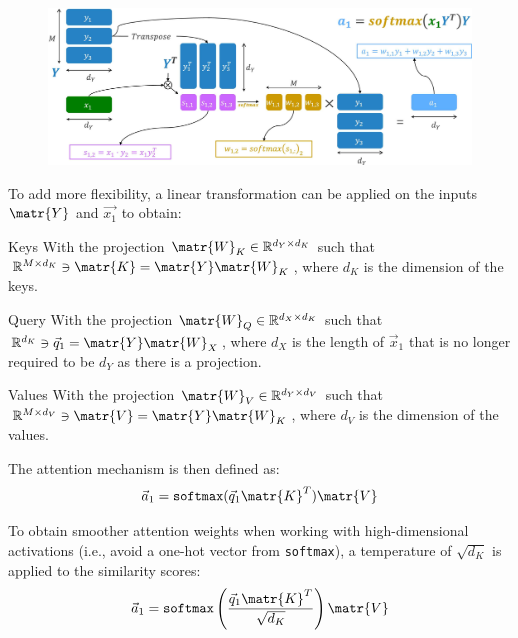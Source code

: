 \begin{description}
        \begin{figure}[H]
            \centering
            \includegraphics[width=0.8\linewidth]{./img/_dot_product_attention.jpg}
        \end{figure}

    \item[Scaled dot-product attention] 
        To add more flexibility, a linear transformation can be applied on the inputs $\matr{Y}$ and $\vec{x_1}$ to obtain:
        \begin{descriptionlist}
            \item[Keys] 
                With the projection $\matr{W}_K \in \mathbb{R}^{d_Y \times d_K}$ such that $\mathbb{R}^{M \times d_K} \ni \matr{K} = \matr{Y} \matr{W}_K$, where $d_K$ is the dimension of the keys.

            \item[Query] 
                With the projection $\matr{W}_Q \in \mathbb{R}^{d_X \times d_K}$ such that $\mathbb{R}^{d_K} \ni \vec{q}_1 = \matr{Y} \matr{W}_X$, where $d_X$ is the length of $\vec{x}_1$ that is no longer required to be $d_Y$ as there is a projection.

            \item[Values]
                With the projection $\matr{W}_V \in \mathbb{R}^{d_Y \times d_V}$ such that $\mathbb{R}^{M \times d_V} \ni \matr{V} = \matr{Y} \matr{W}_K$, where $d_V$ is the dimension of the values.
        \end{descriptionlist}

        The attention mechanism is then defined as:
        \[ \vec{a}_1 = \texttt{softmax}(\vec{q}_1 \matr{K}^T)\matr{V} \]

        To obtain smoother attention weights when working with high-dimensional activations (i.e., avoid a one-hot vector from \texttt{softmax}), a temperature of $\sqrt{d_K}$ is applied to the similarity scores:
        \[ \vec{a}_1 = \texttt{softmax}\left( \frac{\vec{q}_1 \matr{K}^T}{\sqrt{d_K}} \right)\matr{V} \]


\end{description}
